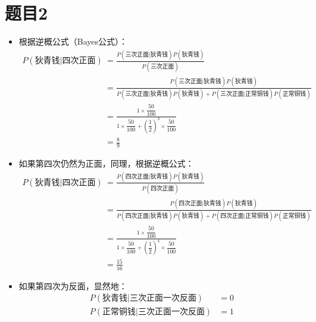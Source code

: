 \documentclass{article}
\begin{document}
\section{题目2}
\begin{itemize}
    \item 根据逆概公式（Bayes公式）：
    \begin{align*}
        P(\text{狄青钱}|\text{四次正面}) &= \frac{P(\text{三次正面}|\text{狄青钱})P(\text{狄青钱})}{P(\text{三次正面})}\\
        &= \frac{P(\text{三次正面}|\text{狄青钱})P(\text{狄青钱})}{P(\text{三次正面}|\text{狄青钱})P(\text{狄青钱})+P(\text{三次正面}|\text{正常铜钱})P(\text{正常铜钱})}\\
        &= \frac{1\times \dfrac{50}{100}}{1\times \dfrac{50}{100}+\left(\dfrac{1}{2}\right)^3\times \dfrac{50}{100}}\\
        & = \frac89
    \end{align*}
    \item 如果第四次仍然为正面，同理，根据逆概公式：
    \begin{align*}
        P(\text{狄青钱}|\text{四次正面}) &= \frac{P(\text{四次正面}|\text{狄青钱})P(\text{狄青钱})}{P(\text{四次正面})}\\
        &= \frac{P(\text{四次正面}|\text{狄青钱})P(\text{狄青钱})}{P(\text{四次正面}|\text{狄青钱})P(\text{狄青钱})+P(\text{四次正面}|\text{正常铜钱})P(\text{正常铜钱})}\\
        &= \frac{1\times \dfrac{50}{100}}{1\times \dfrac{50}{100}+\left(\dfrac{1}{2}\right)^4\times \dfrac{50}{100}}\\
        & = \frac{15}{16}
    \end{align*}
    \item 如果第四次为反面，显然地：
    \begin{align*}
        P(\text{狄青钱}|\text{三次正面一次反面}) &= 0\\
        P(\text{正常铜钱}|\text{三次正面一次反面}) &= 1
    \end{align*}
\end{itemize}
\end{document}
